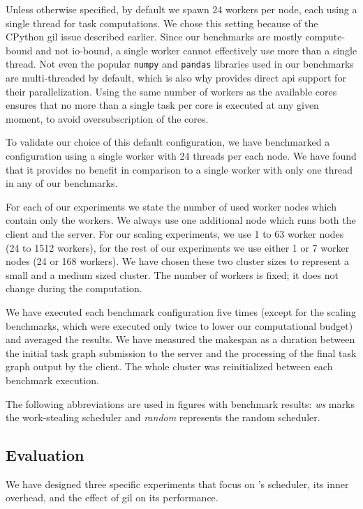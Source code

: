 Unless otherwise specified, by default we spawn \num{24}
\dask{} workers per node, each using a single thread for task computations. We
chose this setting because of the CPython \gls{gil} issue described earlier.
Since our benchmarks are mostly compute-bound and not \gls{io}-bound, a single
worker cannot effectively use more than a single thread. Not even the popular
\texttt{numpy} and \texttt{pandas} libraries used in our benchmarks are
multi-threaded by default, which is also why \dask{} provides direct
\gls{api} support for their parallelization. Using the same number of workers as
the available cores ensures that no more than a single task per core is executed at any given
moment, to avoid oversubscription of the cores.

To validate our choice of this default configuration, we have benchmarked a configuration using a
single worker with \num{24} threads per each node. We have found that it provides
no benefit in comparison to a single worker with only one thread in any of our benchmarks.

For each of our experiments we state the number of used worker nodes which contain only the
workers. We always use one additional node which runs both the client and the server. For our
scaling experiments, we use \num{1} to \num{63} worker nodes
(\num{24} to \num{1512} \dask{} workers), for
the rest of our experiments we use either \num{1} or \num{7}
worker nodes (\num{24} or \num{168} \dask{}
workers). We have chosen these two cluster sizes to represent a small and a medium sized
\dask{} cluster. The number of workers is fixed; it does not change during the
computation.

We have executed each benchmark configuration five times (except for the scaling benchmarks, which
were executed only twice to lower our computational budget) and averaged the results. We have
measured the makespan as a duration between the initial task graph submission to the server and the
processing of the final task graph output by the client. The whole cluster was reinitialized
between each benchmark execution.

The following abbreviations are used in figures with benchmark results: \emph{ws}
marks the work-stealing scheduler and \emph{random} represents the random scheduler.

\subsection{Evaluation}
\label{dask:evaluation}
We have designed three specific experiments that focus on \dask{}'s scheduler,
its inner overhead, and the effect of \gls{gil} on its performance.

